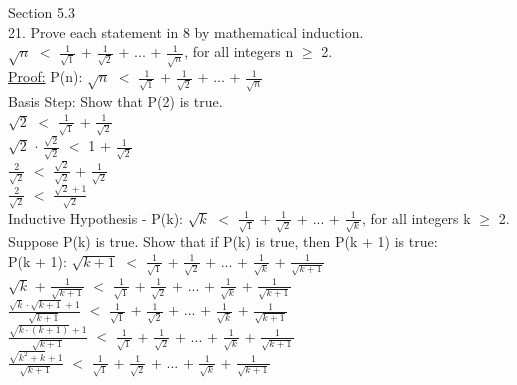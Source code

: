 \documentclass{article}
\begin{document}
Section 5.3\\
21. Prove each statement in 8 by mathematical induction. \\
$\sqrt{n}$ $<$ {\Large $\frac{1}{\sqrt{1}}$} + {\Large $\frac{1}{\sqrt{2}}$} + ... + {\Large $\frac{1}{\sqrt{n}}$}, for all integers n $\geq$ 2. \\
\underline{Proof:} P(n): $\sqrt{n}$ $<$ {\Large $\frac{1}{\sqrt{1}}$} + {\Large $\frac{1}{\sqrt{2}}$} + ... + {\Large $\frac{1}{\sqrt{n}}$}\\
Basis Step: Show that P(2) is true. \\
$\sqrt{2}$ $<$ {\Large $\frac{1}{\sqrt{1}}$} + {\Large $\frac{1}{\sqrt{2}}$}\\
$\sqrt{2}$ $\cdot$ {\Large $\frac{\sqrt{2}}{\sqrt{2}}$} $<$ 1 + {\Large $\frac{1}{\sqrt{2}}$}\\
{\Large $\frac{2}{\sqrt{2}}$} $<$ {\Large $\frac{\sqrt{2}}{\sqrt{2}}$} + {\Large $\frac{1}{\sqrt{2}}$}\\
{\Large $\frac{2}{\sqrt{2}}$} $<$ {\Large $\frac{\sqrt{2} + 1}{\sqrt{2}}$} {\Large \checkmark}\\
Inductive Hypothesis - P(k): $\sqrt{k}$ $<$ {\Large $\frac{1}{\sqrt{1}}$} + {\Large $\frac{1}{\sqrt{2}}$} + ... + {\Large $\frac{1}{\sqrt{k}}$}, for all integers k $\geq$ 2. \\
Suppose P(k) is true. Show that if P(k) is true, then P(k + 1) is true: \\
P(k + 1): $\sqrt{k + 1}$ $<$ {\Large $\frac{1}{\sqrt{1}}$} + {\Large $\frac{1}{\sqrt{2}}$} + ... + {\Large $\frac{1}{\sqrt{k}}$} + {\Large $\frac{1}{\sqrt{k + 1}}$} \\
$\sqrt{k}$ + {\Large $\frac{1}{\sqrt{k + 1}}$} $<$ {\Large $\frac{1}{\sqrt{1}}$} + {\Large $\frac{1}{\sqrt{2}}$} + ... + {\Large $\frac{1}{\sqrt{k}}$} + {\Large $\frac{1}{\sqrt{k + 1}}$} \\
{\Large $\frac{\sqrt{k} \cdot \sqrt{k + 1} + 1}{\sqrt{k + 1}}$} $<$ {\Large $\frac{1}{\sqrt{1}}$} + {\Large $\frac{1}{\sqrt{2}}$} + ... + {\Large $\frac{1}{\sqrt{k}}$} + {\Large $\frac{1}{\sqrt{k + 1}}$} \\
{\Large $\frac{\sqrt{k \cdot (k + 1)} + 1}{\sqrt{k + 1}}$} $<$ {\Large $\frac{1}{\sqrt{1}}$} + {\Large $\frac{1}{\sqrt{2}}$} + ... + {\Large $\frac{1}{\sqrt{k}}$} + {\Large $\frac{1}{\sqrt{k + 1}}$} \\
{\Large $\frac{\sqrt{k^2 + k} + 1}{\sqrt{k + 1}}$} $<$ {\Large $\frac{1}{\sqrt{1}}$} + {\Large $\frac{1}{\sqrt{2}}$} + ... + {\Large $\frac{1}{\sqrt{k}}$} + {\Large $\frac{1}{\sqrt{k + 1}}$} \\
\end{document}
